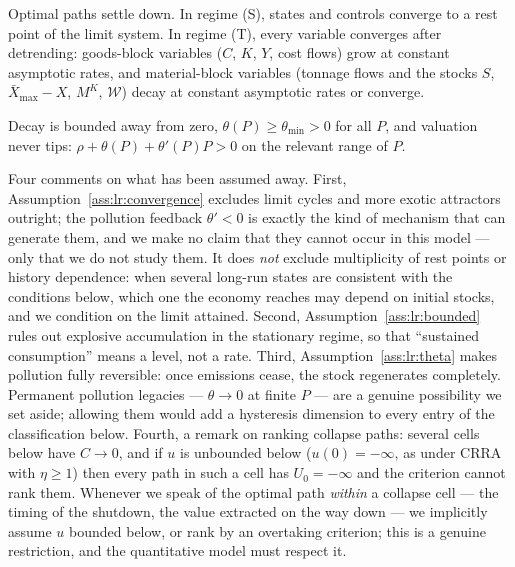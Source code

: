\begin{assumption}[convergence]\label{ass:lr:convergence}
Optimal paths settle down. In regime (S), states and controls converge to a rest point of the limit system. In regime (T), every variable converges after detrending: goods-block variables ($C$, $K$, $Y$, cost flows) grow at constant asymptotic rates, and material-block variables (tonnage flows and the stocks $S$, $\bar X_{\max}-X$, $M^K$, $\mathcal W$) decay at constant asymptotic rates or converge.
\end{assumption}

\begin{assumption}\label{ass:lr:theta}
Decay is bounded away from zero, $\theta\left(P\right)\ge\theta_{\min}>0$ for all $P$, and valuation never tips: $\rho+\theta\left(P\right)+\theta'\left(P\right)P>0$ on the relevant range of $P$.
\end{assumption}

Four comments on what has been assumed away. First, Assumption~\ref{ass:lr:convergence} excludes limit cycles and more exotic attractors outright; the pollution feedback $\theta'<0$ is exactly the kind of mechanism that can generate them, and we make no claim that they cannot occur in this model --- only that we do not study them. It does \emph{not} exclude multiplicity of rest points or history dependence: when several long-run states are consistent with the conditions below, which one the economy reaches may depend on initial stocks, and we condition on the limit attained. Second, Assumption~\ref{ass:lr:bounded} rules out explosive accumulation in the stationary regime, so that ``sustained consumption'' means a level, not a rate. Third, Assumption~\ref{ass:lr:theta} makes pollution fully reversible: once emissions cease, the stock regenerates completely. Permanent pollution legacies --- $\theta\to0$ at finite $P$ --- are a genuine possibility we set aside; allowing them would add a hysteresis dimension to every entry of the classification below. Fourth, a remark on ranking collapse paths: several cells below have $C\to0$, and if $u$ is unbounded below ($u\left(0\right)=-\infty$, as under CRRA with $\eta\ge1$) then every path in such a cell has $U_0=-\infty$ and the criterion cannot rank them. Whenever we speak of the optimal path \emph{within} a collapse cell --- the timing of the shutdown, the value extracted on the way down --- we implicitly assume $u$ bounded below, or rank by an overtaking criterion; this is a genuine restriction, and the quantitative model must respect it.

